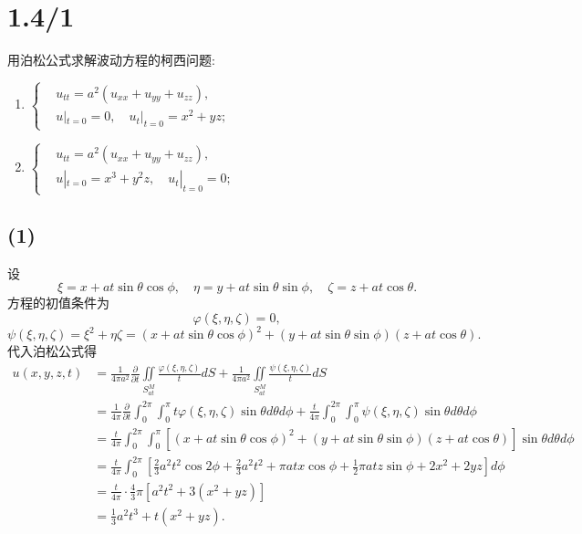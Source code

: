 \documentclass[11pt,a4paper]{article}
\author{刘逸灏 (515370910207)}
\begin{document}
\maketitle

\section{1.4/1}
\begin{problem}
用泊松公式求解波动方程的柯西问题:
\begin{enumerate}
  \item $\left\{
          \begin{aligned}
             & u_{tt}=a^2(u_{xx}+u_{yy}+u_{zz}),   \\
             & u|_{t=0}=0,\quad u_t|_{t=0}=x^2+yz;
          \end{aligned}
          \right.$
  \item $\left\{
          \begin{aligned}
             & u_{tt}=a^2(u_{xx}+u_{yy}+u_{zz}),     \\
             & u|_{t=0}=x^3+y^2z,\quad u_t|_{t=0}=0;
          \end{aligned}
          \right.$
\end{enumerate}
\end{problem}

\subsection*{(1)}
设
$$\xi=x+at\sin\theta\cos\phi,\quad \eta=y+at\sin\theta\sin\phi,\quad \zeta=z+at\cos\theta.$$
方程的初值条件为
$$\varphi(\xi,\eta,\zeta)=0,$$
$$\psi(\xi,\eta,\zeta)=\xi^2+\eta\zeta=(x+at\sin\theta\cos\phi)^2+(y+at\sin\theta\sin\phi)(z+at\cos\theta).$$
代入泊松公式得
\begin{align*}
  u(x,y,z,t)
   & =\frac{1}{4\pi a^2}\frac{\partial}{\partial t}\iint\limits_{S_{at}^M}\frac{\varphi(\xi,\eta,\zeta)}{t}dS+\frac{1}{4\pi a^2}\iint\limits_{S_{at}^M}\frac{\psi(\xi,\eta,\zeta)}{t}dS                    \\
   & =\frac{1}{4\pi}\frac{\partial}{\partial t}\int_0^{2\pi}\int_0^\pi t\varphi(\xi,\eta,\zeta)\sin\theta d\theta d\phi+\frac{t}{4\pi}\int_0^{2\pi}\int_0^\pi \psi(\xi,\eta,\zeta)\sin\theta d\theta d\phi \\
   & =\frac{t}{4\pi}\int_0^{2\pi}\int_0^\pi [(x+at\sin\theta\cos\phi)^2+(y+at\sin\theta\sin\phi)(z+at\cos\theta)]\sin\theta d\theta d\phi                                                                  \\
   & =\frac{t}{4\pi}\int_0^{2\pi} \left[\frac{2}{3} a^2 t^2 \cos 2 \phi +\frac{2}{3}a^2 t^2+\pi  a t x \cos \phi +\frac{1}{2} \pi  a t z \sin \phi +2 x^2+2 y z \right]d\phi                               \\
   & =\frac{t}{4\pi}\cdot\frac{4}{3} \pi  \left[a^2 t^2+3 \left(x^2+y z\right)\right]                                                                                                                      \\
   & =\frac{1}{3}a^2 t^3+t \left(x^2+y z\right).
\end{align*}
\end{document}
